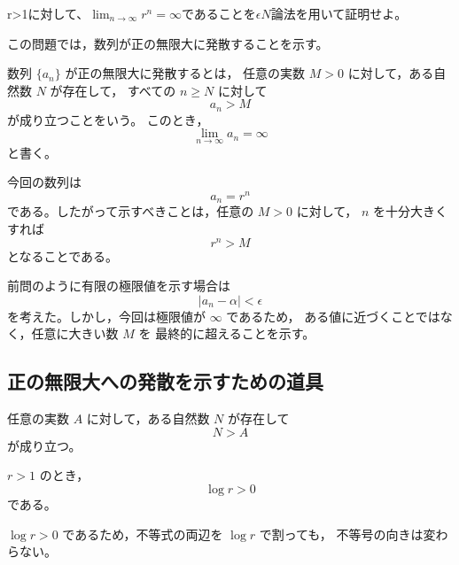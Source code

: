
\begin{exercise}
	r>1に対して、$\lim_{n\rightarrow\infty}r^n=\infty$であることを$\epsilon N$論法を用いて証明せよ。
\end{exercise}

\begin{background}
	この問題では，数列が正の無限大に発散することを示す。

	\begin{definition}[数列が正の無限大に発散すること]
		数列 $\{a_n\}$ が正の無限大に発散するとは，
		任意の実数 $M>0$ に対して，ある自然数 $N$ が存在して，
		すべての $n\geq N$ に対して
		\[
			a_n>M
		\]
		が成り立つことをいう。
		このとき，
		\[
			\lim_{n\to\infty}a_n=\infty
		\]
		と書く。
	\end{definition}

	\begin{remark}
		今回の数列は
		\[
			a_n=r^n
		\]
		である。したがって示すべきことは，任意の $M>0$ に対して，
		$n$ を十分大きくすれば
		\[
			r^n>M
		\]
		となることである。
	\end{remark}

	\begin{remark}
		前問のように有限の極限値を示す場合は
		\[
			|a_n-\alpha|<\epsilon
		\]
		を考えた。しかし，今回は極限値が $\infty$ であるため，
		ある値に近づくことではなく，任意に大きい数 $M$ を
		最終的に超えることを示す。
	\end{remark}

	\subsection{正の無限大への発散を示すための道具}

	\begin{theorem}[アルキメデスの性質]
		任意の実数 $A$ に対して，ある自然数 $N$ が存在して
		\[
			N>A
		\]
		が成り立つ。
	\end{theorem}

	\begin{lemma}
		$r>1$ のとき，
		\[
			\log r>0
		\]
		である。
	\end{lemma}

	\begin{remark}
		$\log r>0$ であるため，不等式の両辺を $\log r$ で割っても，
		不等号の向きは変わらない。
	\end{remark}
\end{background}

